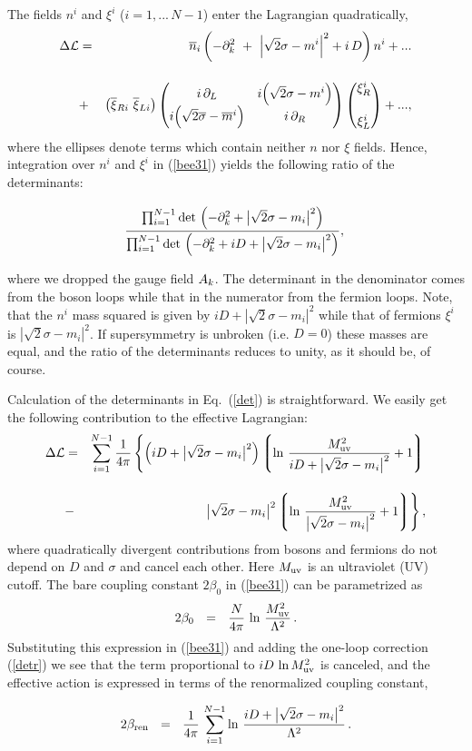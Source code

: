 \documentclass[epsfig,12pt]{article}
\def\beq{\begin{equation}}
\def\eeq{\end{equation}}
\def\beqn{\begin{eqnarray}}
\def\eeqn{\end{eqnarray}}
\newcommand{\cell}{{\mathcal L}}
\newcommand{\pt}{\partial}
\def\beqn{\begin{eqnarray}}
\def\eeqn{\end{eqnarray}}
\def\beq{\begin{equation}}
\def\eeq{\end{equation}}
\newcommand{\p}{\partial}
\newcommand{\ov}{\overline}
\newcommand{\lgr}{\left\lgroup}
\newcommand{\rgr}{\right\rgroup}
\newcommand{\nbar}{\ov{n}}
\newcommand{\bxi}{\ov{\xi}{}}
\begin{document}
The fields $ n^i $ and $ \xi^i $  ($ i = 1,...\, N-1 $) enter the Lagrangian quadratically,
\beqn
\Delta\cell &=&
 \nbar{}_i 
		   \left( - \p_k^2 ~+~ \Bigl| \sqrt{2}\sigma - m^i \Bigr|^2 +  i\, D \right) n^i
		   + ...
\nonumber\\[4mm]
&+&
\left( \bxi_{Ri}\,\,  \bxi_{Li} \right)
		\left( \begin{matrix}
			i\,\pt_L  &  
			i \Bigl(\sqrt{2}\sigma -  m^i\Bigr) \\
			i \Bigl(\sqrt{2}\ov{\sigma} - \ov{m}{}^i \Bigr) &  
			i\,\p_R 
		     \end{matrix} \right)
		\left( \begin{matrix}
			\xi_R^i \\[5mm] \xi_L^i
		     \end{matrix} \right)+ ... ,
\eeqn
where the ellipses denote terms which contain neither $n$ nor $\xi$ fields.
Hence, integration over $n^{i}$ and $\xi^i$ in (\ref{bee31})
yields the following ratio of the determinants:
\beq
 \frac{
\prod_{i=1}^{N-1} {\rm det}\, \left(-\pt_{k}^2 
   + \bigl| \sqrt{2}\sigma - m_i \bigr|^2\right)}{
\prod_{i=1}^{N-1}{\rm det}\, \left(-\pt_{k}^2 +iD
   + \bigl| \sqrt{2}\sigma - m_i \bigr|^2\right)},
\rule{0mm}{10mm}
\label{det}
\eeq
where we dropped the gauge field $A_k\rule{0mm}{5mm}$. The  determinant in the denominator
comes from the
boson loops while that in the numerator from the fermion loops. Note, that the $n^{i}$ mass 
squared
 is given by $iD+|\sqrt{2}\sigma-m_i|^2$ while that of fermions $\xi^i$
is $|\sqrt{2}\sigma-m_i|^2$. If supersymmetry is unbroken (i.e.  $D=0$) these masses are equal,
and the ratio of the determinants reduces to unity, as
it should be, of course.

Calculation of the determinants in Eq.~(\ref{det}) 
is straightforward. 
We easily get the following contribution to the
effective Lagrangian:
\beqn
\Delta{\mathcal  L} 
&=&
\sum_{i=1}^{N-1}\frac{1}{4\pi}\left\{\left(iD+\bigl|\sqrt{2}\sigma-m_i\bigr|^2\right)
\lgr \ln\, {\frac{M_{\rm uv}^2}{iD + \bigl|\sqrt{2}\sigma-m_i\bigr|^2}} + 1 \rgr
\right.
\nonumber\\[4mm]
&-&
\left. 
\bigl|\sqrt{2}\sigma-m_i\bigr|^2
\lgr \ln\, {\frac{M_{\rm uv}^2}{\bigl|\sqrt{2}\sigma-m_i\bigr|^2}} + 1\rgr
\right\},
\label{detr}
\eeqn
where quadratically divergent contributions from bosons and fermions do
not depend on
$D$ and $\sigma$ and cancel each other. Here $M_{\rm uv}$ is an ultraviolet (UV) cutoff.
 The bare coupling constant
 $2\beta_0$ in (\ref{bee31}) can be parametrized as
\beq
2\beta_0~~=~~\frac{N}{4\pi}\, \ln\, {\frac{M_{\rm uv}^2}{\Lambda^2}}\,.
\eeq
Substituting this expression in (\ref{bee31}) and adding 
the one-loop correction
(\ref{detr})
we see that the term proportional to 
$iD \,\ln {M_{\rm uv}^2}$ is canceled, and the effective action is
expressed in terms of the renormalized coupling constant,
\beq
\rule{0mm}{8mm}
	2\beta_{\rm ren}~~=~~\frac{1}{4\pi}\, 
	\sum_{i=1}^{N-1}\ln\, {\frac{iD +\bigl|\sqrt{2}\sigma-m_i\bigr|^2}{\Lambda^2}}\, .
\label{coupling}
\eeq
\end{document}
